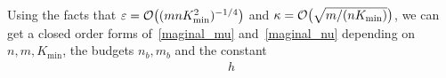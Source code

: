 Using the facts that $\varepsilon = \mathcal{O}\big((mnK_{\min}^2)^{-1/4}\big)$ and $\kappa = \mathcal{O}\big(\sqrt{m/(nK_{\min})}\big)$, we can get a closed order forms of~\eqref{maginal_mu} and~\eqref{maginal_nu} depending on $n,m,K_{\min}$, the budgets $n_b,m_b$ and the constant 
\begin{align*}
	h
\end{align*}
